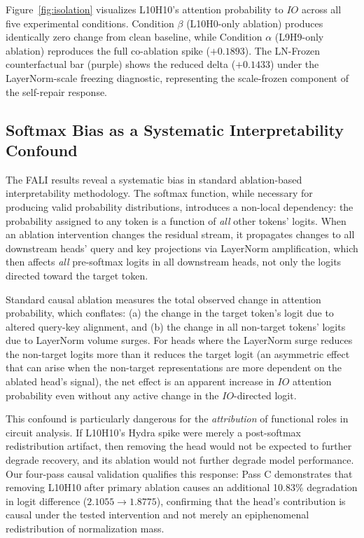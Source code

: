 \documentclass[10pt]{article} %
\begin{document}
Figure~\ref{fig:isolation} visualizes L10H10's attention probability to $IO$ across all five experimental conditions. Condition $\beta$ (L10H0-only ablation) produces identically zero change from clean baseline, while Condition $\alpha$ (L9H9-only ablation) reproduces the full co-ablation spike ($+0.1893$). The LN-Frozen counterfactual bar (purple) shows the reduced delta ($+0.1433$) under the LayerNorm-scale freezing diagnostic, representing the scale-frozen component of the self-repair response.

\subsection{Softmax Bias as a Systematic Interpretability Confound}
\label{subsec:bias}

The FALI results reveal a systematic bias in standard ablation-based
interpretability methodology. The softmax function, while necessary for
producing valid probability distributions, introduces a non-local dependency:
the probability assigned to any token is a function of \emph{all} other tokens'
logits. When an ablation intervention changes the residual stream, it propagates
changes to all downstream heads' query and key projections via LayerNorm
amplification, which then affects \emph{all} pre-softmax logits in all downstream
heads, not only the logits directed toward the target token.

Standard causal ablation measures the total observed change in attention
probability, which conflates: (a) the change in the target token's logit due to
altered query-key alignment, and (b) the change in all non-target tokens' logits
due to LayerNorm volume surges. For heads where the LayerNorm surge reduces
the non-target logits more than it reduces the target logit (an asymmetric
effect that can arise when the non-target representations are more dependent on
the ablated head's signal), the net effect is an apparent increase in $IO$
attention probability even without any active change in the $IO$-directed logit.

This confound is particularly dangerous for the \emph{attribution} of functional
roles in circuit analysis. If L10H10's Hydra spike were merely a post-softmax redistribution artifact, then removing the head would not be expected to further degrade recovery, and its ablation would not further degrade model performance. Our
four-pass causal validation qualifies this response: Pass C
demonstrates that removing L10H10 after primary ablation causes an additional
10.83\% degradation in logit difference ($2.1055 \to 1.8775$), confirming that
the head's contribution is causal under the tested intervention and not merely an
epiphenomenal redistribution of normalization mass.
\end{document}
